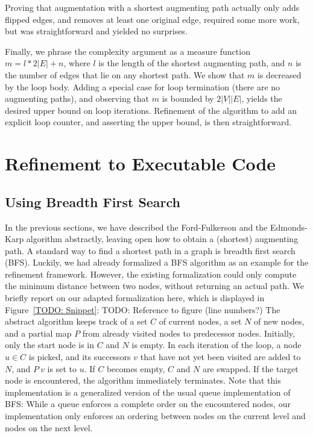 \documentclass{llncs}
\begin{document}
  Proving that augmentation with a shortest augmenting path actually only adds flipped edges, and removes at least one original edge, required some more work,
  but was straightforward and yielded no surprises.
  
  Finally, we phrase the complexity argument as a measure function $m = l*2|E| + n$, where $l$ is the length of the shortest augmenting path,
  and $n$ is the number of edges that lie on any shortest path. We show that $m$ is decreased by the loop body.
  Adding a special case for loop termination (there are no augmenting paths), and observing that $m$ is bounded by $2|V||E|$, yields 
  the desired upper bound on loop iterations. Refinement of the algorithm to add an explicit loop counter, and asserting the upper bound, is then straightforward.
  



    
\section{Refinement to Executable Code}
  \subsection{Using Breadth First Search}

  In the previous sections, we have described the Ford-Fulkerson and the Edmonds-Karp algorithm abstractly,  
  leaving open how to obtain a (shortest) augmenting path. A standard way to find a shortest path in a graph 
  is breadth first search (BFS). Luckily, we had already formalized a BFS algorithm as an example for the refinement framework.
  However, the existing formalization could only compute the minimum distance between two nodes, without returning an actual path.
  We briefly report on our adapted formalization here, which is displayed in Figure~\ref{TODO: Snippet}: 
  TODO: Reference to figure (line numbers?)
  The abstract algorithm keeps track of a set $C$ of current nodes, a set $N$ of new nodes, and a partial map $P$ from already visited nodes to predecessor nodes.
  Initially, only the start node is in $C$ and $N$ is empty. In each iteration of the loop, a node $u\in C$ is picked, and its successors $v$ that have not yet been 
  visited are added to $N$, and $P~v$ is set to $u$. If $C$ becomes empty, $C$ and $N$ are swapped. If the target node is encountered, the algorithm immediately terminates.
  Note that this implementation is a generalized version of the usual queue implementation of BFS: While a queue enforces a complete order on the encountered nodes, our 
  implementation only enforces an ordering between nodes on the current level and nodes on the next level. 
\end{document}
